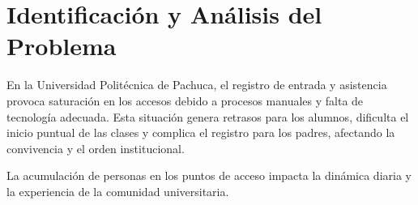 \section{Identificación y Análisis del Problema}




En la Universidad Politécnica de Pachuca, el registro de entrada y asistencia provoca saturación en los accesos debido a procesos manuales y falta de tecnología adecuada. Esta situación genera retrasos para los alumnos, dificulta el inicio puntual de las clases y complica el registro para los padres, afectando la convivencia y el orden institucional.

La acumulación de personas en los puntos de acceso impacta la dinámica diaria y la experiencia de la comunidad universitaria.
